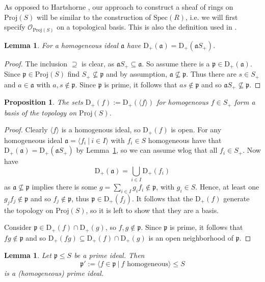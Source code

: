 \documentclass{scrartcl}
\newcommand{\D}[1]{\mathrm{D}_+(#1)}
\newcommand{\p}{\mathfrak{p}}
\renewcommand{\a}{\mathfrak{a}}
\newcommand{\Spec}{\mathrm{Spec}}
\newcommand{\Proj}{\mathrm{Proj}}
\renewcommand{\O}{\mathcal{O}}
\newcommand{\citestacks}[1]{\cite[\href{https://stacks.math.columbia.edu/tag/#1}{Tag #1}]{stacks}}
\newtheorem{prop}[subsection]{Proposition}
\newtheorem{lemma}[subsection]{Lemma}
\theoremstyle{definition}
\begin{document}
As opposed to Hartshorne \cite{hartshorne}, our approach to construct a sheaf of rings on $\Proj(S)$ will be similar to the construction of $\Spec(R)$, i.e. we will first specify $\O_{\Proj(S)}$ on a topological basis.
This is also the definition used in \citestacks{01M6}.
\begin{lemma}
    \label{prop:Splus_invariance}
    For a homogeneous ideal $\a$ have $\D{\a} = \D{\a S_+}$.
\end{lemma}
\begin{proof}
    The inclusion $\supseteq$ is clear, as $\a S_+ \subseteq \a$.
    So assume there is a $\p \in \D{\a}$.
    Since $\p \in \Proj(S)$ find $S_+ \not\subseteq \p$ and by assumption, $\a \not\subseteq \p$.
    Thus there are $s \in S_+$ and $a \in \a$ with $a, s \notin \p$.
    Since $\p$ is prime, it follows that $as \notin \p$ and so $\a S_+ \not\subseteq \p$.
\end{proof}
\begin{prop}
    \label{prop:basis_topology}
    The sets $\D{f} := \D{\langle f \rangle}$ for homogeneous $f \in S_+$ form a basis of the topology on $\Proj(S)$.
\end{prop}
\begin{proof}
    Clearly $\langle f \rangle$ is a homogenous ideal, so $\D{f}$ is open.
    For any homogeneous ideal $\a = \langle f_i \ | \ i \in I \rangle$ with $f_i \in S$ homogeneous have that $\D{\a} = \D{\a S_+}$ by Lemma~\ref{prop:Splus_invariance}, so we can assume wlog that all $f_i \in S_+$.
    Now have
    \begin{equation*}
        \D{\a} = \bigcup_{i \in I} \D{f_i}
    \end{equation*}
    as $\a \not\subseteq \p$ implies there is some $g = \sum_{i \in I} g_i f_i \notin \p$, with $g_i \in S$.
    Hence, at least one $g_j f_j \notin \p$ and so $f_j \notin \p$, thus $\p \in \D{f_j}$.
    It follows that the $\D{f}$ generate the topology on $\Proj(S)$, so it is left to show that they are a basis.

    Consider $\p \in \D{f} \cap \D{g}$, so $f, g \notin \p$.
    Since $\p$ is prime, it follows that $fg \notin \p$ and so $\D{fg} \subseteq \D{f} \cap \D{g}$ is an open neighborhood of $\p$.
\end{proof}
\begin{lemma}
    \label{prop:homogeneous_part_prime}
    Let $\p \leq S$ be a prime ideal.
    Then
    \begin{equation*}
        \p' := \langle f \in \p \ | \ \text{$f$ homogeneous} \rangle \leq S
    \end{equation*}
    is a (homogeneous) prime ideal.
\end{lemma}
\end{document}
